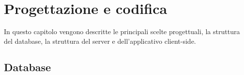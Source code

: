 
\chapter{Progettazione e codifica}
\label{cap:progettazione-codifica}


In questo capitolo vengono descritte le principali scelte progettuali, la struttura del database, la struttura del server e dell'applicativo client-side.








\section{Database}
\label{sec:database}

